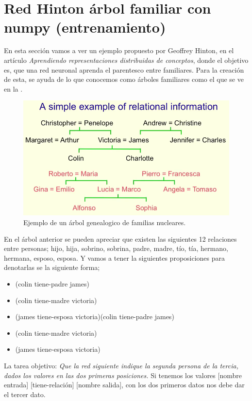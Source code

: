 \section{Red Hinton árbol familiar con numpy (entrenamiento)}

En esta sección vamos a ver un ejemplo propuesto por Geoffrey Hinton, en el artículo \emph{Aprendiendo representaciones distribuidas de conceptos}, donde el objetivo es, que una red neuronal aprenda el parentesco entre familiares. Para la creación de esta, se ayuda de lo que conocemos como árboles familiares como el que se ve en la .

  \begin{figure}[h]
   \centering
   \includegraphics[scale=.5]{../Figuras/Hinton/ArbolGenealogico.png}
   \caption{Ejemplo de un árbol genealogico de familias nucleares.}
  \label{fig:arbolG}
  \end{figure}

En el árbol anterior se pueden apreciar que existen las siguientes 12 relaciones entre personas; hijo, hija, sobrino, sobrina, padre, madre, tío, tía, hermano, hermana, esposo, esposa. Y vamos a tener la siguientes proposiciones para denotarlas se la siguiente forma; 

\begin{itemize}
 \item (colin tiene-padre james)
 \item(colin tiene-madre victoria)
 \item(james tiene-esposa victoria)(colin tiene-padre james)
 \item(colin tiene-madre victoria)
 \item(james tiene-esposa victoria) 
\end{itemize}

La tarea objetivo: \textit{Que la red siguiente indique la segunda persona de la tercia, dados los valores en las dos primeras posiciones.} Si tenemos los valores [nombre entrada] [tiene-relación] [nombre salida], con los dos primeros datos nos debe dar el tercer dato.

